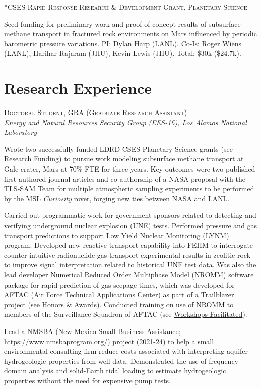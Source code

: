 \documentclass[11pt, letterpaper]{article}
\newcommand{\years}[1]{\marginnote{\scriptsize #1}}
\begin{document}
\years{2020}\textsc{*CSES Rapid Response Research \& Development Grant, Planetary
Science}
\begin{adjustwidth}{5pt}{0pt}
	Seed funding for preliminary work and proof-of-concept results of
	subsurface methane transport in fractured rock environments on Mars
	influenced by periodic barometric pressure variations.
	PI: Dylan Harp (LANL). Co-Is: Roger Wiens (LANL), Harihar Rajaram (JHU),
	Kevin Lewis (JHU). Total: \$30k (\$24.7k). %
\end{adjustwidth}


\section*{Research Experience}
\noindent
\years{2020 - pres.}\textsc{Doctoral Student, GRA (Graduate Research Assistant)}\\
\textit{Energy and Natural Resources Security Group (EES-16), Los Alamos National Laboratory}
\begin{adjustwidth}{5pt}{0pt}
    Wrote two successfully-funded LDRD CSES Planetary Science grants (see
    \hyperref[sec:funding]{Research Funding}) to pursue work modeling subsurface
    methane transport at Gale crater, Mars at 70\% FTE for three years. Key
    outcomes were two published first-authored journal articles and co-authorship
    of a NASA proposal with the TLS-SAM Team for multiple atmospheric sampling
    experiments to be performed by the MSL \textit{Curiosity} rover, forging new
    ties between NASA and LANL.

    Carried out programmatic work for government sponsors related to detecting
    and verifying underground nuclear explosion (UNE) tests. Performed pressure
    and gas transport predictions to support Low Yield Nuclear Monitoring
    (LYNM) program. Developed new reactive transport capability into FEHM to
    interrogate counter-intuitive radionuclide gas transport experimental
    results in zeolitic rock to improve signal interpretation related to
    historical UNE test data. Was also the lead developer Numerical Reduced
    Order Multiphase Model (NROMM) software package for rapid prediction of gas
    seepage times, which was developed for AFTAC (Air Force Technical
    Applications Center) as part of a Trailblazer project (see
        \hyperref[sec:awards]{Honors \& Awards}). Conducted training on use of
        NROMM to members of the  Surveillance Squadron of AFTAC  (see
        \hyperref[sec:workshops]{Workshops Facilitated}). 

	Lead a NMSBA (New Mexico Small Business Assistance;
	\href{https://www.nmsbaprogram.org/}{https://www.nmsbaprogram.org/})
	project (2021-24) to help a small environmental consulting firm reduce
	costs associated with interpreting aquifer hydrogeologic properties from
	well data.  Demonstrated the use of frequency domain analysis and
	solid-Earth tidal loading to estimate hydrogeologic properties without the
	need for expensive pump tests. 
\end{adjustwidth}
\end{document}
